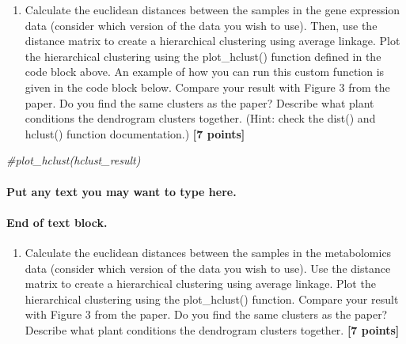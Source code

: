 \documentclass[
]{article}
\newenvironment{Shaded}{\begin{snugshade}}{\end{snugshade}}
\newcommand{\CommentTok}[1]{\textcolor[rgb]{0.56,0.35,0.01}{\textit{#1}}}
\providecommand{\tightlist}{%
  \setlength{\itemsep}{0pt}\setlength{\parskip}{0pt}}
\begin{document}
\begin{enumerate}
\def\labelenumi{\Alph{enumi})}
\tightlist
\item
  Calculate the euclidean distances between the samples in the gene
  expression data (consider which version of the data you wish to use).
  Then, use the distance matrix to create a hierarchical clustering
  using average linkage. Plot the hierarchical clustering using the
  plot\_hclust() function defined in the code block above. An example of
  how you can run this custom function is given in the code block below.
  Compare your result with Figure 3 from the paper. Do you find the same
  clusters as the paper? Describe what plant conditions the dendrogram
  clusters together. (Hint: check the dist() and hclust() function
  documentation.) \textbf{{[}7 points{]}}
\end{enumerate}

\begin{Shaded}
\begin{Highlighting}[]
\CommentTok{\#plot\_hclust(hclust\_result)}
\end{Highlighting}
\end{Shaded}

\hypertarget{put-any-text-you-may-want-to-type-here.-21}{%
\paragraph{Put any text you may want to type
here.}\label{put-any-text-you-may-want-to-type-here.-21}}

\hypertarget{end-of-text-block.-23}{%
\paragraph{End of text block.}\label{end-of-text-block.-23}}

\begin{enumerate}
\def\labelenumi{\Alph{enumi})}
\setcounter{enumi}{1}
\tightlist
\item
  Calculate the euclidean distances between the samples in the
  metabolomics data (consider which version of the data you wish to
  use). Use the distance matrix to create a hierarchical clustering
  using average linkage. Plot the hierarchical clustering using the
  plot\_hclust() function. Compare your result with Figure 3 from the
  paper. Do you find the same clusters as the paper? Describe what plant
  conditions the dendrogram clusters together. \textbf{{[}7 points{]}}
\end{enumerate}
\end{document}
